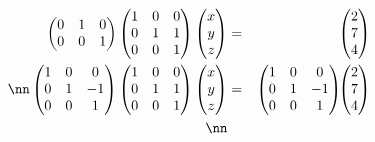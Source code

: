 \begin{example}
\begin{eqnarray*}
{\begin{pmatrix}
0 & 1 & 0 \\
0& 0 & 1  \\
\end{pmatrix} 
}
\begin{pmatrix}
1 & 0 & 0 \\
0 & 1 & 1  \\ 
0& 0 & 1  \\
\end{pmatrix} 
\begin{pmatrix}
 x \\ 
y \\
z 
\end{pmatrix} 
&=&
\phantom{
\begin{pmatrix}
\frac12 & 0 & 0  \\ 
0 & 1 &  0\\
0& 0 & 1  \\
\end{pmatrix} 
}
~
\begin{pmatrix}
2 \\
7 \\ 
4\\
\end{pmatrix} 
\\ \nn %
\begin{pmatrix}
1 & 0 & 0  \\ 
0 & 1 & -1 \\
0& 0 & 1  \\
\end{pmatrix} 
\begin{pmatrix}
1 & 0 & 0 \\
0 & 1 & 1  \\ 
0& 0 & 1  \\
\end{pmatrix} 
\begin{pmatrix}
 x \\ 
y \\
z 
\end{pmatrix} 
&=&
\begin{pmatrix}
1 & 0 & 0  \\ 
0 & 1 &  -1\\
0& 0  &  1  \\
\end{pmatrix} 
\! \!
\begin{pmatrix}
2 \\
7 \\ 
4\\
\end{pmatrix} 
\\\nn%

\end{eqnarray*}
\end{example}
